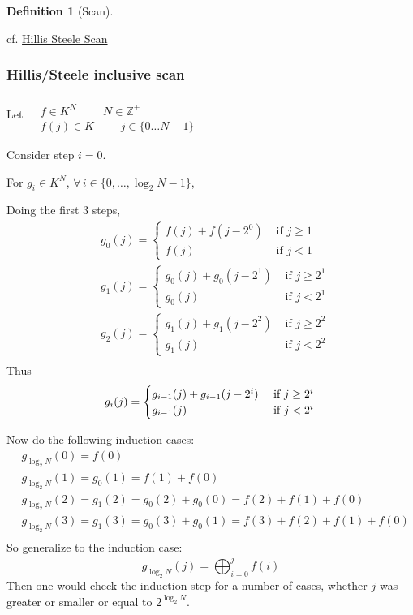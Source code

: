 \documentclass[10pt]{amsart}
\newtheorem{definition}{Definition}
\begin{document}
\begin{multicols*}{2}
\begin{definition}[Scan]
  \end{definition}



cf. \href{https://classroom.udacity.com/courses/cs344/lessons/86719951/concepts/880351220923#}{Hillis Steele Scan}

\subsubsection*{Hillis/Steele inclusive scan}

Let $\begin{aligned} & \quad \\
  & f \in K^N \, \qquad \, N \in \mathbb{Z}^+ \\
  & f(j) \in K \, \qquad \, j \in \lbrace 0 \dots N-1 \rbrace \end{aligned}$

Consider step $i=0$.

For $g_i \in K^N$, $\forall \, i\in \lbrace 0 , \dots , \log_2{N}-1 \rbrace$, 

Doing the first 3 steps,
\[
\begin{aligned}
  & g_0(j) = \begin{cases} f(j) + f(j-2^0) & \text{ if } j \geq 1 \\
    f(j) & \text{ if } j < 1 \end{cases} \\
  & g_1(j) = \begin{cases} g_0(j) + g_0(j-2^1) & \text{ if } j \geq 2^1 \\
    g_0(j) & \text{ if } j < 2^1 \end{cases} \\
  & g_2(j) = \begin{cases} g_1(j) + g_1(j-2^2) & \text{ if } j \geq 2^2 \\
    g_1(j) & \text{ if } j < 2^2 \end{cases} \\
\end{aligned}
\]
Thus
\[
   g_i(j) = \begin{cases} g_{i-1}(j) + g_{i-1}(j-2^i) & \text{ if } j \geq 2^i \\
    g_{i-1}(j) & \text{ if } j < 2^i \end{cases} \\
\]

Now do the following induction cases:
\[
\begin{aligned}
  & g_{\log_2{N}}(0) = f(0) \\ 
  & g_{\log_2{N}}(1) = g_0(1) = f(1) + f(0) \\
  & g_{\log_2{N}}(2) = g_1(2) = g_0(2) + g_0(0) = f(2)+f(1) + f(0) \\
  & g_{\log_2{N}}(3) = g_1(3) = g_0(3) + g_0(1) = f(3)+f(2)+f(1)+f(0)  \\
\end{aligned}
\]
So generalize to the induction case:
\[
g_{ \log_2{N} }(j) = \bigoplus_{i=0}^j f(i)
\]
Then one would check the induction step for a number of cases, whether $j$ was greater or smaller or equal to $2^{ \log_2{N}}$.  


\end{multicols*}
\end{document}
